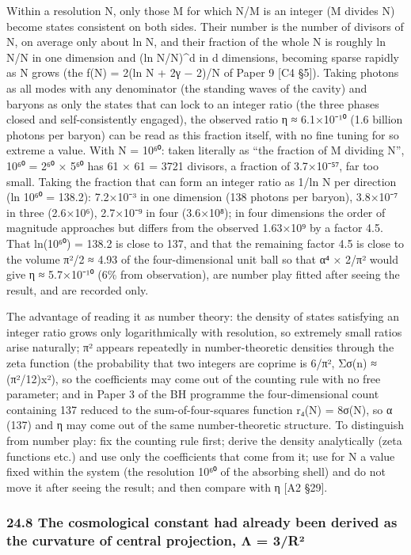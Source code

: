 \documentclass[
  a4paper,
]{article}
\begin{document}
Within a resolution N, only those M for which N/M is an integer (M
divides N) become states consistent on both sides. Their number is the
number of divisors of N, on average only about ln N, and their fraction
of the whole N is roughly ln N/N in one dimension and (ln N/N)\^{}d in d
dimensions, becoming sparse rapidly as N grows (the f(N) = 2(ln N + 2γ −
2)/N of Paper 9 {[}C4 §5{]}). Taking photons as all modes with any
denominator (the standing waves of the cavity) and baryons as only the
states that can lock to an integer ratio (the three phases closed and
self-consistently engaged), the observed ratio η ≈ 6.1×10⁻¹⁰ (1.6
billion photons per baryon) can be read as this fraction itself, with no
fine tuning for so extreme a value. With N = 10⁶⁰: taken literally as
``the fraction of M dividing N'', 10⁶⁰ = 2⁶⁰ × 5⁶⁰ has 61 × 61 = 3721
divisors, a fraction of 3.7×10⁻⁵⁷, far too small. Taking the fraction
that can form an integer ratio as 1/ln N per direction (ln 10⁶⁰ =
138.2): 7.2×10⁻³ in one dimension (138 photons per baryon), 3.8×10⁻⁷ in
three (2.6×10⁶), 2.7×10⁻⁹ in four (3.6×10⁸); in four dimensions the
order of magnitude approaches but differs from the observed 1.63×10⁹ by
a factor 4.5. That ln(10⁶⁰) = 138.2 is close to 137, and that the
remaining factor 4.5 is close to the volume π²/2 ≈ 4.93 of the
four-dimensional unit ball so that α⁴ × 2/π² would give η ≈ 5.7×10⁻¹⁰
(6\% from observation), are number play fitted after seeing the result,
and are recorded only.

The advantage of reading it as number theory: the density of states
satisfying an integer ratio grows only logarithmically with resolution,
so extremely small ratios arise naturally; π² appears repeatedly in
number-theoretic densities through the zeta function (the probability
that two integers are coprime is 6/π², Σσ(n) ≈ (π²/12)x²), so the
coefficients may come out of the counting rule with no free parameter;
and in Paper 3 of the BH programme the four-dimensional count containing
137 reduced to the sum-of-four-squares function r₄(N) = 8σ(N), so α
(137) and η may come out of the same number-theoretic structure. To
distinguish from number play: fix the counting rule first; derive the
density analytically (zeta functions etc.) and use only the coefficients
that come from it; use for N a value fixed within the system (the
resolution 10⁶⁰ of the absorbing shell) and do not move it after seeing
the result; and then compare with η {[}A2 §29{]}.

\subsubsection{24.8 The cosmological constant had already been derived
as the curvature of central projection, Λ =
3/R²}\label{the-cosmological-constant-had-already-been-derived-as-the-curvature-of-central-projection-ux3bb-3ruxb2}
\end{document}
